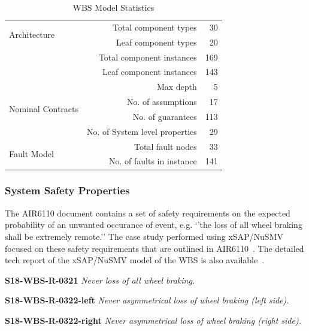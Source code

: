 \begin{table}[h!]
  \begin{center}
    \begin{tabular}{l|r|r} %
      \hline
      \multirow{2}{*}{Architecture} & Total component types & 30\\ %
      & Leaf component types & 20\\ 
      & Total component instances & 169\\ 
      & Leaf component instances & 143\\ 
      & Max depth & 5\\ 
      \hline
      \multirow{2}{*}{Nominal Contracts} & No. of assumptions & 17\\ %
      & No. of guarantees & 113\\ 
      & No. of System level properties & 29\\ 
      \hline
      \multirow{2}{*}{Fault Model} & Total fault nodes & 33\\ %
      & No. of faults in instance & 141\\ 
      \hline
    \end{tabular}
    \vspace{1em}
    \caption{WBS Model Statistics}
    \label{tab:model_stats}
  \end{center}
\end{table}

\subsubsection{System Safety Properties}
The AIR6110 document contains a set of safety requirements on the expected probability of an unwanted occurance of event, e.g. `'the loss of all wheel braking shall be extremely remote.'' The case study performed using xSAP/NuSMV focused on these safety requirements that are outlined in AIR6110~\cite{mattareiThesis, DBLP:conf/cav/BozzanoCPJKPRT15}. The detailed tech report of the xSAP/NuSMV model of the WBS is also available~\cite{air6110TechReport}.

\textbf{S18-WBS-R-0321} \textit{Never loss of all wheel braking.}

\textbf{S18-WBS-R-0322-left} \textit{Never asymmetrical loss of wheel braking (left side).}

\textbf{S18-WBS-R-0322-right} \textit{Never asymmetrical loss of wheel braking (right side).}

